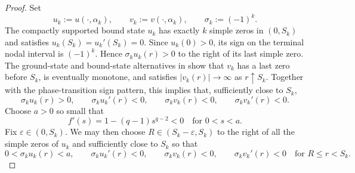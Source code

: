 \documentclass[11pt]{article}
\begin{document}
\begin{proof}
Set
\[
u_k:=u(\cdot,\alpha_k),
\qquad
v_k:=v(\cdot,\alpha_k),
\qquad
\sigma_k:=(-1)^k.
\]
The compactly supported bound state \(u_k\) has exactly \(k\)
simple zeros in \((0,S_k)\) and satisfies $u_k(S_k)=u_k'(S_k)=0$.
Since \(u_k(0)>0\), its sign on the terminal nodal interval is
\((-1)^k\). Hence $\sigma_k u_k(r)>0$
to the right of its last simple zero.
{The ground-state and bound-state alternatives in
\cite[Lemma~5.1(b),(c)]{ZhangZhang} show that $v_k$ has a last zero before
$S_k$, is eventually monotone, and satisfies
$|v_k(r)|\to\infty$ as $r\uparrow S_k$.}
Together with the phase-transition sign pattern, this implies that,
sufficiently close to \(S_k\),
\[
\sigma_k u_k(r)>0,
\qquad\sigma_k u_k'(r)<0,
\qquad\sigma_k v_k(r)<0,
\qquad
\sigma_k v_k'(r)<0.
\]
Choose \(a>0\) so small that
\[
f'(s)=1-(q-1)s^{q-2}<0
\quad\text{for }0<s<a.
\]
{Fix $\varepsilon\in(0,S_k)$.} We may then choose
$R\in(S_k-\varepsilon,S_k)$
to the right of all the simple zeros of \(u_k\) and sufficiently
close to \(S_k\) so that
\begin{equation}\label{inequa}
  0<\sigma_k u_k(r)<a,
\qquad
\sigma_k u_k'(r)<0,
\qquad
\sigma_k v_k(r)<0,
\qquad
\sigma_k v_k'(r)<0\quad\text{for }R\leq r<S_k.
\end{equation}


\end{proof}
\end{document}
